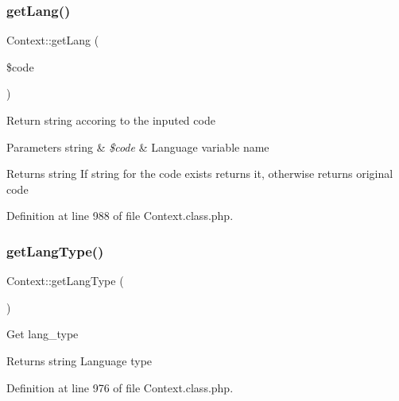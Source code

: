 \hypertarget{classContext_a9af9269b04542f7462d27a63226e0ff3}{}\label{classContext_a9af9269b04542f7462d27a63226e0ff3} 
\subsubsection{\texorpdfstring{get\+Lang()}{getLang()}}
{\footnotesize\ttfamily Context\+::get\+Lang (\begin{DoxyParamCaption}\item[{}]{\$code }\end{DoxyParamCaption})}

Return string accoring to the inputed code


\begin{DoxyParams}[1]{Parameters}
string & {\em \$code} & Language variable name \\
\hline
\end{DoxyParams}
\begin{DoxyReturn}{Returns}
string If string for the code exists returns it, otherwise returns original code 
\end{DoxyReturn}


Definition at line 988 of file Context.\+class.\+php.

\hypertarget{classContext_ae75d6f4064d09e48d0d76614b6997e29}{}\label{classContext_ae75d6f4064d09e48d0d76614b6997e29} 
\subsubsection{\texorpdfstring{get\+Lang\+Type()}{getLangType()}}
{\footnotesize\ttfamily Context\+::get\+Lang\+Type (\begin{DoxyParamCaption}{ }\end{DoxyParamCaption})}

Get lang\+\_\+type

\begin{DoxyReturn}{Returns}
string Language type 
\end{DoxyReturn}


Definition at line 976 of file Context.\+class.\+php.

\hypertarget{classContext_a8ee4ad4396e92a54d2aa7d079771619f}{}\label{classContext_a8ee4ad4396e92a54d2aa7d079771619f} 
